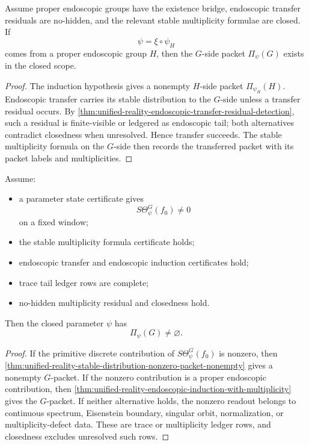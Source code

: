 \begin{theorem}
\label{thm:unified-reality-endoscopic-induction-with-multiplicity}
Assume proper endoscopic groups have the existence bridge, endoscopic
transfer residuals are no-hidden, and the relevant stable multiplicity
formulae are closed. If
$$
\psi=\xi\circ\psi_H
$$
comes from a proper endoscopic group $H$, then the $G$-side packet
$\Pi_\psi(G)$ exists in the closed scope.
\end{theorem}
\begin{proof}
The induction hypothesis gives a nonempty $H$-side packet
$\Pi_{\psi_H}(H)$. Endoscopic transfer carries its stable distribution
to the $G$-side unless a transfer residual occurs. By
\autoref{thm:unified-reality-endoscopic-transfer-residual-detection},
such a residual is finite-visible or ledgered as endoscopic tail; both
alternatives contradict closedness when unresolved. Hence transfer
succeeds. The stable multiplicity formula on the $G$-side then records
the transferred packet with its packet labels and multiplicities.
\end{proof}

\begin{theorem}
\label{thm:unified-reality-general-g-existence-bridge-multiplicity-form}
Assume:
\begin{itemize}
\item a parameter state certificate gives
$$
S\Theta_\psi^G(f_0)\ne0
$$
on a fixed window;
\item the stable multiplicity formula certificate holds;
\item endoscopic transfer and endoscopic induction certificates hold;
\item trace tail ledger rows are complete;
\item no-hidden multiplicity residual and closedness hold.
\end{itemize}
Then the closed parameter $\psi$ has
$$
\Pi_\psi(G)\ne\varnothing.
$$
\end{theorem}
\begin{proof}
If the primitive discrete contribution of $S\Theta_\psi^G(f_0)$ is
nonzero, then
\autoref{thm:unified-reality-stable-distribution-nonzero-packet-nonempty}
gives a nonempty $G$-packet. If the nonzero contribution is a proper
endoscopic contribution, then
\autoref{thm:unified-reality-endoscopic-induction-with-multiplicity}
gives the $G$-packet. If neither alternative holds, the nonzero readout
belongs to continuous spectrum, Eisenstein boundary, singular orbit,
normalization, or multiplicity-defect data. These are trace or
multiplicity ledger rows, and closedness excludes unresolved such rows.
\end{proof}

